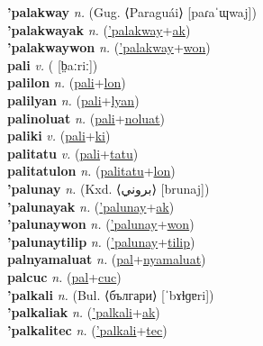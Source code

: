 \textbf{'palakway} \textit{n.} (Gug. ⟨Paraguái⟩ [paɾaˈɰwaj])
 \label{'palakway} \\
\textbf{'palakwayak} \textit{n.} (\hyperref['palakway]{'palakway}+\hyperref[ak]{ak})
 \label{'palakwayak} \\
\textbf{'palakwaywon} \textit{n.} (\hyperref['palakway]{'palakway}+\hyperref[won]{won})
 \label{'palakwaywon} \\
\textbf{pali} \textit{v.} ( [b̤aːriː])
 \label{pali} \\
\textbf{palilon} \textit{n.} (\hyperref[pali]{pali}+\hyperref[lon]{lon})
 \label{palilon} \\
\textbf{palilyan} \textit{n.} (\hyperref[pali]{pali}+\hyperref[lyan]{lyan})
 \label{palilyan} \\
\textbf{palinoluat} \textit{n.} (\hyperref[pali]{pali}+\hyperref[noluat]{noluat})
 \label{palinoluat} \\
\textbf{paliki} \textit{v.} (\hyperref[pali]{pali}+\hyperref[ki]{ki})
 \label{paliki} \\
\textbf{palitatu} \textit{v.} (\hyperref[pali]{pali}+\hyperref[tatu]{tatu})
 \label{palitatu} \\
\textbf{palitatulon} \textit{n.} (\hyperref[palitatu]{palitatu}+\hyperref[lon]{lon})
 \label{palitatulon} \\
\textbf{'palunay} \textit{n.} (Kxd. ⟨بروني⟩ [brunaj])
 \label{'palunay} \\
\textbf{'palunayak} \textit{n.} (\hyperref['palunay]{'palunay}+\hyperref[ak]{ak})
 \label{'palunayak} \\
\textbf{'palunaywon} \textit{n.} (\hyperref['palunay]{'palunay}+\hyperref[won]{won})
 \label{'palunaywon} \\
\textbf{'palunaytilip} \textit{n.} (\hyperref['palunay]{'palunay}+\hyperref[tilip]{tilip})
 \label{'palunaytilip} \\
\textbf{palnyamaluat} \textit{n.} (\hyperref[pal]{pal}+\hyperref[nyamaluat]{nyamaluat})
 \label{palnyamaluat} \\
\textbf{palcuc} \textit{n.} (\hyperref[pal]{pal}+\hyperref[cuc]{cuc})
 \label{palcuc} \\
\textbf{'palkali} \textit{n.} (Bul. ⟨българи⟩ [ˈbɤɫɡɐri])
 \label{'palkali} \\
\textbf{'palkaliak} \textit{n.} (\hyperref['palkali]{'palkali}+\hyperref[ak]{ak})
 \label{'palkaliak} \\
\textbf{'palkalitec} \textit{n.} (\hyperref['palkali]{'palkali}+\hyperref[tec]{tec})
 \label{'palkalitec} \\
